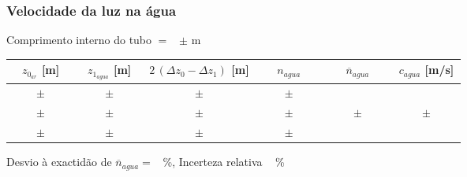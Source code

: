 \documentclass[a4paper,12pt]{article}  %
\begin{document}
\subsubsection{\sf Velocidade da luz na água}\label{sec:dados_vid}

\noindent Comprimento interno do tubo $=$~\underline{\makebox[1cm][r]{~}} $\pm$ \underline{\makebox[1cm][r]{~}} m  

\begin{center}
	\begin{tabular}{|c|c|c|c|c|c|}
	\hline
	 $z_{0_{ar}}$  [m]   &  $z_{1_{agua}}$  [m] & $2\,(\Delta z_0- \Delta z_1 )$ [m] & $n_{agua}$  & $\overline{n}_{agua}$ & $c_{agua}$ [m/s]\\
	\hline \hline
	 $ \quad\quad \pm \quad\quad $  & $ \quad\quad \pm \quad\quad $  & $ \pm $ & $ \quad\quad \pm \quad\quad $ &  & \\ \cline{1-4}
	  $ \pm $& $ \quad \pm \quad $ & $ \pm $ & $ \quad \pm \quad$ & $ \quad\quad \pm \quad\quad$  & $ \quad\quad \pm \quad\quad$ \\ \cline{1-4}
	  $ \pm $ & $ \quad \pm \quad $ &  $\pm $ & $ \quad \pm \quad $ &  & \\ \hline
			\end{tabular}
\end{center}

\noindent Desvio à exactidão de $\overline{n}_{agua} =$~\underline{\makebox[1cm][r]{~}} \%, 
 Incerteza relativa ~\underline{\makebox[1cm][r]{~}} \%



\end{document}
